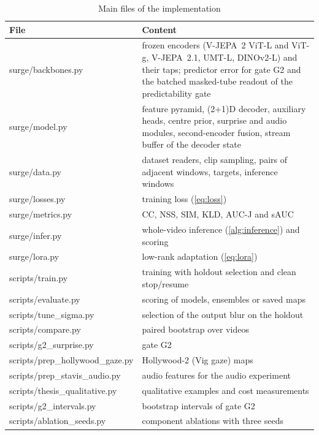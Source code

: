 \begin{table}[htbp]
  \centering
  \caption{Main files of the implementation}\label{tab:code}
  \footnotesize
  \begin{tabularx}{\textwidth}{@{}>{\ttfamily\raggedright}p{6.2cm}>{\raggedright\arraybackslash}X@{}}
    \toprule
    \textrm{\textbf{File}} & \textbf{Content} \\
    \midrule
    surge/backbones.py & frozen encoders (\acrshort{V-JEPA}~2 \acrshort{ViT}-L and \acrshort{ViT}-g, \acrshort{V-JEPA}~2.1, \acrshort{UMT}-L, DINOv2-L) and their taps; predictor error for gate G2 and the batched masked-tube readout of the predictability gate \\
    surge/model.py & feature pyramid, (2+1)D decoder, auxiliary heads, centre prior, surprise and audio modules, second-encoder fusion, stream buffer of the decoder state \\
    surge/data.py & dataset readers, clip sampling, pairs of adjacent windows, targets, inference windows \\
    surge/losses.py & training loss (\cref{eq:loss}) \\
    surge/metrics.py & \acrshort{CC}, \acrshort{NSS}, \acrshort{SIM}, \acrshort{KLD}, \acrshort{AUC-J} and \acrshort{sAUC} \\
    surge/infer.py & whole-video inference (\cref{alg:inference}) and scoring \\
    surge/lora.py & low-rank adaptation (\cref{eq:lora}) \\
    scripts/train.py & training with holdout selection and clean stop/resume \\
    scripts/evaluate.py & scoring of models, ensembles or saved maps \\
    scripts/tune\_sigma.py & selection of the output blur on the holdout \\
    scripts/compare.py & paired bootstrap over videos \\
    scripts/g2\_surprise.py & gate G2 \\
    scripts/prep\_hollywood\_gaze.py & Hollywood-2 (Vig gaze) maps \\
    scripts/prep\_stavis\_audio.py & audio features for the audio experiment \\
    scripts/thesis\_qualitative.py & qualitative examples and cost measurements \\
    scripts/g2\_intervals.py & bootstrap intervals of gate G2 \\
    scripts/ablation\_seeds.py & component ablations with three seeds \\

\end{tabularx}
\end{table}
